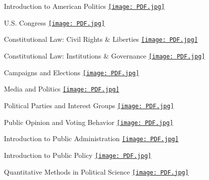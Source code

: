 \documentclass[letterpaper,11pt]{article}
\newcommand{\pdf}{\texttt{[image: PDF.jpg]}}
\begin{document}
{\small
\begin{multicols}{2}
\begin{description}
    \item Introduction to American Politics \href{https://nicholasrjenkins.science/teaching/intro-to-american-politics/Intro\%20to\%20American\%20Politics.pdf}{\pdf}
    \item U.S. Congress \href{https://nicholasrjenkins.science/teaching/congress/Congress.pdf}{\pdf}
    \item Constitutional Law: Civil Rights \& Liberties \href{https://nicholasrjenkins.science/teaching/constitutional-law-civil-rights-and-civil-liberties/Constitutional\%20Law\%20-\%20Civil\%20Rights\%20and\%20Civil\%20Liberties.pdf}{\pdf} 
    \item Constitutional Law: Institutions \& Governance \href{https://nicholasrjenkins.science/teaching/constitutional-law-institutions-and-governance/Constitutional\%20Law\%20-\%20Institutions\%20and\%20Governance.pdf}{\pdf}
    \item Campaigns and Elections \href{https://nicholasrjenkins.science/teaching/campaigns-and-elections/Campaigns\%20and\%20Elections.pdf}{\pdf}
    \item Media and Politics \href{https://nicholasrjenkins.science/teaching/media-and-politics/Media\%20and\%20Politics.pdf}{\pdf}
    \item Political Parties and Interest Groups \href{https://nicholasrjenkins.science/teaching/parties-and-interest-groups/Parties\%20and\%20Interest\%20Groups.pdf}{\pdf}
    \item Public Opinion and Voting Behavior \href{https://nicholasrjenkins.science/teaching/public-opinion-and-voting-behavior/Public\%20Opinion\%20and\%20Voting\%20Behavior.pdf}{\pdf}
    \item Introduction to Public Administration \href{https://nicholasrjenkins.science/teaching/public-administration/Public\%20Administration.pdf}{\pdf}
    \item Introduction to Public Policy \href{https://nicholasrjenkins.science/teaching/public-policy/Public\%20Policy.pdf}{\pdf}
    \item Quantitative Methods in Political Science \href{https://nicholasrjenkins.science/teaching/research-methods/Research\%20Methods.pdf}{\pdf}
\end{description}
\end{multicols}
}

\vspace{.25cm}
\end{document}
